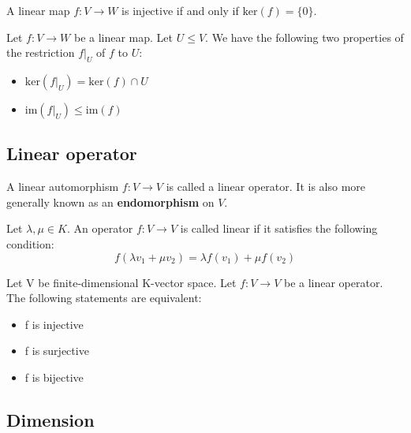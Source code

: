 	\begin{theorem}
	    	A linear map $f:V\rightarrow W$ is injective if and only if $\text{ker}(f) = \{0\}$.
	\end{theorem}
	\begin{property}\label{linalgebra:theorem:restriction_kernel_image}
	        Let $f:V\rightarrow W$ be a linear map. Let $U\leq V$. We have the following two properties of the restriction $f|_U$ of $f$ to $U$:
        	\begin{itemize}
			\item $\text{ker}\left(f|_U\right) = \text{ker}(f)\cap U$
        		\item $\text{im}\left(f|_U\right) \leq \text{im}(f)$
		\end{itemize}
	\end{property}
    
\subsection{Linear operator}

    	\begin{definition}
	    	A linear automorphism $f: V \rightarrow V$ is called a linear operator. It is also more generally known as an \textbf{endomorphism} on $V$.
	\end{definition}
    	\begin{property}
		Let $\lambda, \mu \in K$. An operator $f: V \rightarrow V$ is called linear if it satisfies the following condition:
	        \begin{equation}
			\label{linalgebra:operators:linearity}
        	        f(\lambda v_1 + \mu v_2) = \lambda f(v_1) + \mu f(v_2)
		\end{equation}
	\end{property}
        
        \begin{theorem}
		Let V be finite-dimensional K-vector space. Let $f:V\rightarrow V$ be a linear operator. The following statements are equivalent:
        	\begin{itemize}
            		\item f is injective
			\item f is surjective
                	\item f is bijective
		\end{itemize}
	\end{theorem}
        
\subsection{Dimension}

